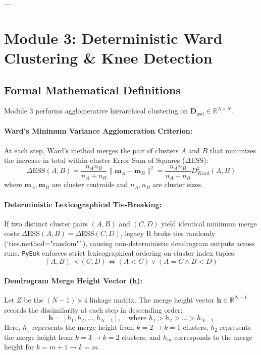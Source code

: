 \documentclass[11pt,a4paper]{article}
\begin{document}
---

\section{Module 3: Deterministic Ward Clustering \& Knee Detection}

\subsection{Formal Mathematical Definitions}

Module 3 performs agglomerative hierarchical clustering on $\mathbf{D}_{\text{psd}} \in \mathbb{R}^{N \times N}$.

\paragraph{Ward's Minimum Variance Agglomeration Criterion:} At each step, Ward's method merges the pair of clusters $A$ and $B$ that minimizes the increase in total within-cluster Error Sum of Squares ($\Delta \text{ESS}$):
\begin{equation}
\Delta \text{ESS}(A, B) = \frac{n_A n_B}{n_A + n_B} \|\mathbf{m}_A - \mathbf{m}_B\|^2 = \frac{n_A n_B}{n_A + n_B} D_{\text{Ward}}^2(A, B)
\end{equation}
where $\mathbf{m}_A, \mathbf{m}_B$ are cluster centroids and $n_A, n_B$ are cluster sizes.

\paragraph{Deterministic Lexicographical Tie-Breaking:} If two distinct cluster pairs $(A, B)$ and $(C, D)$ yield identical minimum merge costs $\Delta \text{ESS}(A, B) = \Delta \text{ESS}(C, D)$, legacy R broke ties randomly (`ties.method="random"`), causing non-deterministic dendrogram outputs across runs. \texttt{PyEuk} enforces strict lexicographical ordering on cluster index tuples:
\begin{equation}
(A, B) \prec (C, D) \iff (A < C) \lor (A = C \land B < D)
\end{equation}

\paragraph{Dendrogram Merge Height Vector ($\mathbf{h}$):}
Let $Z$ be the $(N-1) \times 4$ linkage matrix. The merge height vector $\mathbf{h} \in \mathbb{R}^{N-1}$ records the dissimilarity at each step in descending order:
\begin{equation}
\mathbf{h} = [h_1, h_2, \dots, h_{N-1}], \quad \text{where } h_1 > h_2 > \dots > h_{N-1}
\end{equation}
Here, $h_1$ represents the merge height from $k=2 \rightarrow k=1$ clusters, $h_2$ represents the merge height from $k=3 \rightarrow k=2$ clusters, and $h_m$ corresponds to the merge height for $k = m+1 \rightarrow k = m$.
\end{document}
